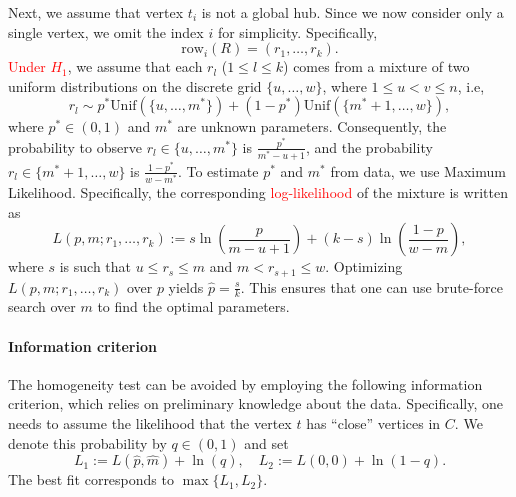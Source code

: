 \documentclass{llncs}
\begin{document}
Next, we assume that vertex $t_i$ is not a global hub. Since we now consider only a single vertex, we omit the index $i$ for simplicity. Specifically,
\[
\text{row}_{i}(R) = (r_{1}, \dots, r_{k}).
\]
\textcolor{red}{Under $H_1$}, we assume that each $r_l$ ($1\le l \le k$) comes from a mixture of two uniform distributions on the discrete grid $\{u, \dots, w\}$, where $1\le u < v \le n$, i.e,
\[
r_l \sim p^* \text{Unif}\left(\{u, \dots, m^*\}\right) + (1-p^*)\text{Unif}\left(\{m^{*}+1, \dots, w\}\right),
\]
where $p^* \in (0, 1)$ and $m^*$ are unknown parameters.
Consequently, the probability to observe $r_l \in \{u, \dots, m^*\}$ is $\frac{p^{*}}{m^* - u + 1}$, and the probability $r_l \in \{ m^*+1, \dots, w\}$ is $\frac{1 - p^{*}}{w - m^*}$.
To estimate $p^*$ and $m^*$ from data, we use Maximum Likelihood. Specifically, the corresponding  \textcolor{red}{log-likelihood} of the mixture is written as
\[
L(p, m; r_1, \dots, r_k) := s\ln\left(\frac{p}{m-u+1}\right) + (k-s)\ln\left(\frac{1-p}{w - m}\right),
\]
where $ s$ is such that $u \le r_{s} \le m$ and $m < r_{s+1} \le w$. Optimizing $L(p, m; r_1, \dots, r_k)$ over $p$ yields $\hat{p} = \frac{s}{k}$. This ensures that one can use brute-force search over $m$ to find the optimal parameters.

\paragraph{Information criterion}
The homogeneity test can be avoided by employing the following information criterion, which relies on preliminary knowledge about the data. Specifically, one needs to assume the likelihood that the vertex $t$ has ``close'' vertices in $C$. We denote this probability by $q \in (0, 1)$ and set
\[
L_1 := L(\hat{p}, \hat{m}) + \ln(q),
\quad
L_2 := L(0, 0) + \ln(1-q).
\]
The best fit corresponds to $\max\{L_1, L_2\}$.




\end{document}
